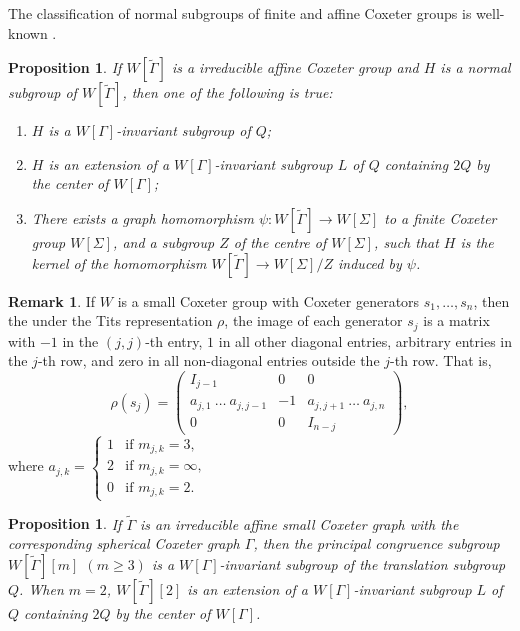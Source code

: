\documentclass[12pt]{amsart}
\newtheorem{proposition}[equation]{Proposition}
\theoremstyle{definition}
\newtheorem{remark}[equation]{Remark}
\numberwithin{equation}{section}
\begin{document}
The classification of normal subgroups of finite and affine Coxeter groups is well-known \cite[Theorem 0.2]{MR1490241}. 
  \begin{proposition}\label{affnor}
 If $W[\tilde{\Gamma}]$ is a irreducible affine Coxeter group and $H$ is a normal subgroup of $W[\tilde{\Gamma}]$, then one of the following is true:
 \begin{enumerate}
\item $H$ is a $W[\Gamma]$-invariant subgroup of $Q$;
\item $H$ is an extension of a $W[\Gamma]$-invariant subgroup $L$ of $Q$ containing $2 Q$ by the center of $W[\Gamma]$;
\item There exists a graph homomorphism $\psi: W[\tilde{\Gamma}] \rightarrow W[\Sigma]$ to a finite Coxeter group $W[\Sigma]$, and a subgroup $Z$ of the centre of $W[\Sigma]$, such that $H$ is the kernel of the homomorphism $W[\tilde{\Gamma}] \rightarrow W[\Sigma] / Z$ induced by $\psi$.
\end{enumerate}
  \end{proposition}
\begin{remark}\label{rmk:images_jtits}
If $W$ is a small Coxeter group with Coxeter generators $s_1,\ldots, s_n$, then the under the Tits representation $\rho$, the image of each generator $s_j$  is a matrix with $-1$ in the $(j,j)$-th entry, $1$ in all other diagonal entries, arbitrary entries in the $j$-th row, and zero in all non-diagonal entries outside the $j$-th row.
That is, 
$$
\rho(s_j)=\left(\begin{array}{c|c|c}I_{j-1} & 0 & 0 \\
\hline
a_{j,1}\ \ldots \ a_{j,j-1} & -1 & a_{j,j+1} \ \ldots \ a_{j,n} \\
\hline
0 & 0 & I_{n-j}
\end{array}\right),
$$
where $a_{j,k}=\begin{cases}
1 & \text {if } m_{j,k}=3, \\
2 & \text {if } m_{j,k}=\infty, \\
0 & \text {if } m_{j,k}=2.
\end{cases}$
\end{remark}
\begin{proposition}
If $\tilde{\Gamma}$ is an irreducible affine small Coxeter graph with the corresponding spherical Coxeter graph $\Gamma$, then the principal congruence subgroup $W[\tilde{\Gamma}][m]$ $(m\geq 3)$ is a $W[\Gamma]$-invariant subgroup of the translation subgroup $Q$. When $m=2$, $W[\tilde{\Gamma}][2]$ is an extension of a $W[\Gamma]$-invariant subgroup $L$ of $Q$ containing $2Q$ by the center of $W[\Gamma]$.
\end{proposition}
\end{document}
